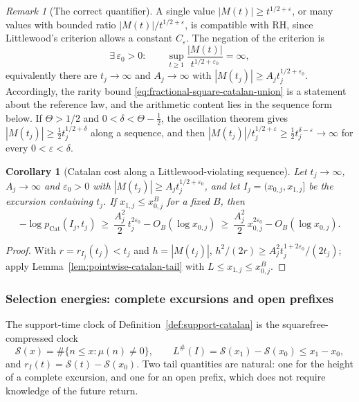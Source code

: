 \documentclass[11pt]{amsart}
\numberwithin{equation}{section}
\theoremstyle{plain}
\newtheorem{corollary}[theorem]{Corollary}
\theoremstyle{definition}
\theoremstyle{remark}
\newtheorem{remark}[theorem]{Remark}
\newcommand{\eps}{\varepsilon}
\newcommand{\Sq}{\mathcal{S}}
\begin{document}
\begin{remark}[The correct quantifier]
\label{rem:quantifier}
A single value $|M(t)|\ge t^{1/2+\eps}$, or many values with bounded ratio
$|M(t)|/t^{1/2+\eps}$, is compatible with RH, since Littlewood's criterion
allows a constant $C_\eps$. The negation of the criterion is
\[
\exists\,\eps_0>0:\qquad
\sup_{t\ge1}\frac{|M(t)|}{t^{1/2+\eps_0}}=\infty,
\]
equivalently there are $t_j\to\infty$ and $A_j\to\infty$ with
$|M(t_j)|\ge A_jt_j^{1/2+\eps_0}$. Accordingly, the rarity bound
\eqref{eq:fractional-square-catalan-union} is a statement about the
reference law, and the arithmetic content lies in the sequence form
below. If $\Theta>1/2$ and $0<\delta<\Theta-\frac12$, the oscillation
theorem gives $|M(t_j)|\ge\frac12t_j^{1/2+\delta}$ along a sequence, and then
$|M(t_j)|/t_j^{1/2+\eps}\ge\frac12t_j^{\delta-\eps}\to\infty$ for every
$0<\eps<\delta$.
\end{remark}

\begin{corollary}[Catalan cost along a Littlewood-violating sequence]
\label{cor:catalan-sequence}
Let $t_j\to\infty$, $A_j\to\infty$ and $\eps_0>0$ with
$|M(t_j)|\ge A_jt_j^{1/2+\eps_0}$, and let $I_j=(x_{0,j},x_{1,j}]$ be the
excursion containing $t_j$. If $x_{1,j}\le x_{0,j}^{B}$ for a fixed $B$,
then
\[
-\log p_{\mathrm{Cat}}(I_j,t_j)\ \ge\ \frac{A_j^2}{2}\,t_j^{2\eps_0}
-O_B(\log x_{0,j})\ \ge\ \frac{A_j^2}{2}\,x_{0,j}^{2\eps_0}-O_B(\log x_{0,j}).
\]
\end{corollary}

\begin{proof}
With $r=r_{I_j}(t_j)<t_j$ and $h=|M(t_j)|$,
$h^2/(2r)\ge A_j^2t_j^{1+2\eps_0}/(2t_j)$; apply
Lemma~\ref{lem:pointwise-catalan-tail} with $L\le x_{1,j}\le x_{0,j}^B$.
\end{proof}

\subsubsection*{Selection energies: complete excursions and open prefixes}

The support-time clock of Definition~\ref{def:support-catalan} is the
squarefree-compressed clock
\[
\Sq(x)=\#\{n\le x:\mu(n)\ne0\},\qquad L^\#(I)=\Sq(x_1)-\Sq(x_0)\le x_1-x_0,
\]
and $r_I(t)=\Sq(t)-\Sq(x_0)$. Two tail quantities are natural: one for the
height of a complete excursion, and one for an open prefix, which does not
require knowledge of the future return.
\end{document}

